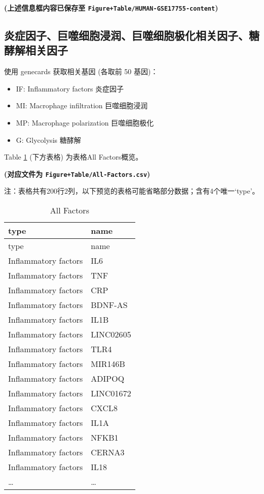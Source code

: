 \documentclass[
]{article}
\providecommand{\tightlist}{%
  \setlength{\itemsep}{0pt}\setlength{\parskip}{0pt}}
\begin{document}
\textbf{(上述信息框内容已保存至 \texttt{Figure+Table/HUMAN-GSE17755-content})}

\hypertarget{ux708eux75c7ux56e0ux5b50ux5de8ux566cux7ec6ux80deux6d78ux6da6ux5de8ux566cux7ec6ux80deux6781ux5316ux76f8ux5173ux56e0ux5b50ux7cd6ux9175ux89e3ux76f8ux5173ux56e0ux5b50}{%
\subsection{炎症因子、巨噬细胞浸润、巨噬细胞极化相关因子、糖酵解相关因子}\label{ux708eux75c7ux56e0ux5b50ux5de8ux566cux7ec6ux80deux6d78ux6da6ux5de8ux566cux7ec6ux80deux6781ux5316ux76f8ux5173ux56e0ux5b50ux7cd6ux9175ux89e3ux76f8ux5173ux56e0ux5b50}}

使用 genecards 获取相关基因 (各取前 50 基因)：

\begin{itemize}
\tightlist
\item
  IF: Inflammatory factors 炎症因子
\item
  MI: Macrophage infiltration 巨噬细胞浸润
\item
  MP: Macrophage polarization 巨噬细胞极化
\item
  G: Glycolysis 糖酵解
\end{itemize}

Table \ref{tab:All-Factors} (下方表格) 为表格All Factors概览。

\textbf{(对应文件为 \texttt{Figure+Table/All-Factors.csv})}

\begin{center}\begin{tcolorbox}[colback=gray!10, colframe=gray!50, width=0.9\linewidth, arc=1mm, boxrule=0.5pt]注：表格共有200行2列，以下预览的表格可能省略部分数据；含有4个唯一`type'。
\end{tcolorbox}
\end{center}

\begin{longtable}[]{@{}ll@{}}
\caption{\label{tab:All-Factors}All Factors}\tabularnewline
\toprule
type & name\tabularnewline
\midrule
\endfirsthead
\toprule
type & name\tabularnewline
\midrule
\endhead
Inflammatory factors & IL6\tabularnewline
Inflammatory factors & TNF\tabularnewline
Inflammatory factors & CRP\tabularnewline
Inflammatory factors & BDNF-AS\tabularnewline
Inflammatory factors & IL1B\tabularnewline
Inflammatory factors & LINC02605\tabularnewline
Inflammatory factors & TLR4\tabularnewline
Inflammatory factors & MIR146B\tabularnewline
Inflammatory factors & ADIPOQ\tabularnewline
Inflammatory factors & LINC01672\tabularnewline
Inflammatory factors & CXCL8\tabularnewline
Inflammatory factors & IL1A\tabularnewline
Inflammatory factors & NFKB1\tabularnewline
Inflammatory factors & CERNA3\tabularnewline
Inflammatory factors & IL18\tabularnewline
\ldots{} & \ldots{}\tabularnewline
\bottomrule
\end{longtable}
\end{document}
